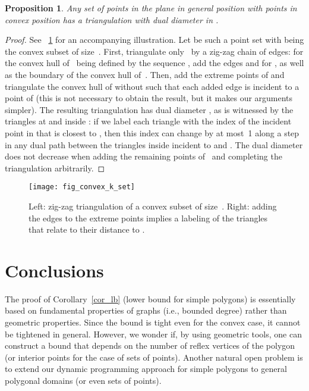 \documentclass{article}
\newtheorem{prop}[theorem]{Proposition}
\begin{document}
\begin{prop}\label{prp:convex_subset}
Any set of  points in the plane in general position with  points in convex position has a triangulation with dual diameter in .
\end{prop}
\begin{proof}
See \figurename~\ref{fig:fig_convex_k_set} for an accompanying illustration.
Let  be such a point set with  being the convex subset of size~.
First, triangulate only~ by a zig-zag chain of edges: for the convex hull of~ being defined by the sequence , add the edges  and  for , as well as the boundary of the convex hull of~.
Then, add the extreme points of  and triangulate the convex hull of  without  such that each added edge is incident to a point of  (this is not necessary to obtain the result, but it makes our arguments simpler).
The resulting triangulation has dual diameter ,
as is witnessed by the triangles at  and  inside : if we label each triangle with the index of the incident point in  that is closest to , then this index can change by at most~1 along a step in any dual path
between the triangles inside  incident to  and
.
The dual diameter does not decrease when adding the remaining points of~ and completing the triangulation arbitrarily.
\end{proof}

\begin{figure}
\centering
\texttt{[image: fig\_convex\_k\_set]}
\caption{Left: zig-zag triangulation of a convex subset of size~.
Right: adding the edges to the extreme points implies a labeling of the triangles that relate to their distance to .}
\label{fig:fig_convex_k_set}
\end{figure}


\section{Conclusions}\label{sec_conclusion}

The proof of Corollary~\ref{cor_lb} (lower bound for simple polygons) 
is essentially based on fundamental properties of graphs (i.e., bounded 
degree) rather than geometric properties.
Since the bound is tight even for the convex case, it cannot be 
tightened in general.
However, we wonder if, by using geometric tools, one can construct a 
bound that depends on the number of reflex vertices of the polygon 
(or interior points for the case of sets of points).
Another natural open problem is to extend our dynamic programming 
approach for simple polygons to general polygonal domains 
(or even sets of points).
\end{document}
